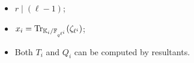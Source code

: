 \documentclass[12pt]{beamer}
\begin{document}
\begin{frame}
\begin{columns}
\begin{column}{0.65\textwidth}
\begin{center}
\begin{tikzpicture}[thick, node distance=2cm, inner sep = 2pt]
        \end{tikzpicture}
      \end{center}
    \end{column}
    \begin{column}{0.35\textwidth}
      \begin{block}{}
        \begin{itemize}
        \item<1-> $r\mid(\ell-1)$;
        \item<1-> $x_i = \Tr_{\KK_i / \FF_{q^{\ell^i}}}(\zeta_{\ell^i})$;
        \item<2-> Both $T_i$ and $Q_i$
          can be computed by
          resultants.
        \end{itemize}
      \end{block}
    \end{column}
  \end{columns}
\end{frame}

\end{document}
